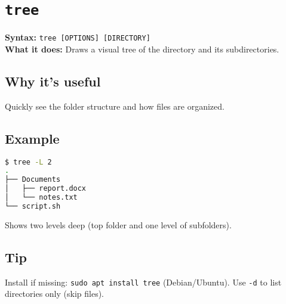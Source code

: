 \documentclass[10pt,oneside]{scrbook}
\begin{document}
\section{\texttt{tree}}
\begin{cmdbox}
  \textbf{Syntax:} \lstinline!tree [OPTIONS] [DIRECTORY]! \\
  \textbf{What it does:} Draws a visual tree of the directory and its subdirectories.
\end{cmdbox}
\begin{commanddetails}
  \subsection*{Why it's useful}
  Quickly see the folder structure and how files are organized.

  \subsection*{Example}
  \begin{lstlisting}[language=bash]
$ tree -L 2
.
├── Documents
│   ├── report.docx
│   └── notes.txt
└── script.sh
  \end{lstlisting}
  Shows two levels deep (top folder and one level of subfolders).

  \subsection*{Tip}
  Install if missing: \lstinline!sudo apt install tree! (Debian/Ubuntu).
  Use \lstinline!-d! to list directories only (skip files).
\end{commanddetails}

\end{document}
